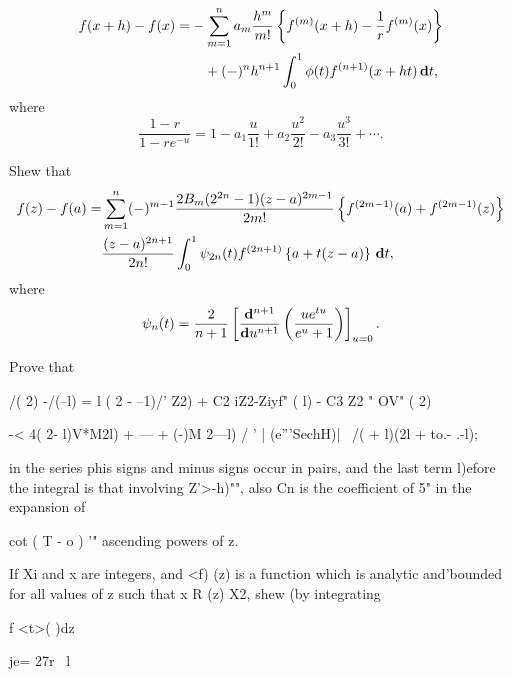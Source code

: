 \begin{wandwmiscexamples}
\begin{wandwmiscexample}
\begin{align*}
      f(x+h) - f(x)
      =&
      -
      \sum_{m=1}^{n}
      a_{m}
      \frac{h^{m}}{m!}
      \left\{ 
        f^{(m)}(x+h) - \frac{1}{r} f^{(m)}(x)
       \right\}
      \\
      & \quad
      +
      (-)^{n} h^{n+1}
      \int_{0}^{1}
      \phi(t) f^{(n+1)}(x+ht) \, \mathbf{d} t,
    \end{align*}
    where
    $$
    \frac{1-r}{1 - r e^{-u}}
    =
    1
    -
    a_{1} \frac{u}{1!}
    +
    a_{2} \frac{u^{2}}{2!}
    -
    a_{3} \frac{u^{3}}{3!}
    +
    \cdots.
    $$
  \end{wandwmiscexample}
  \begin{wandwmiscexample}
    Shew that
    \begin{align*}
      f(z) - f(a)
      =&
      \sum_{m=1}^{n}
      (-)^{m-1}
      \frac{2 B_{m} (2^{2n} - 1)(z-a)^{2m-1}}{2m!}
      \thebrace{
        f^{(2m-1)}(a)
        +
        f^{(2m-1)}(z)
      }
      \\
      &
      \hfill
      \frac{(z-a)^{2n+1}}{2n!}
      \int_{0}^{1}
      \psi_{2n}(t)
      f^{(2n+1)}\thebrace{
        a + t(z-a)
      }
      \dmeasure t,
    \end{align*}
    where
    $$
    \psi_{n}(t)
    =
    \frac{2}{n+1}
    \left[ 
      \frac{\mathbf{d}^{n+1}}{\mathbf{d} u^{n+1}}
      \left( 
        \frac{u e^{tu}}{e^{u} + 1}
       \right)
     \right]_{u=0}.
    $$
  \end{wandwmiscexample}
  \begin{wandwmiscexample}
    Prove that

    /( 2) -/(--l) = l ( 2 - --1)/' Z2) + C2 iZ2-Ziyf" ( l) - C3 Z2 " OV" (
    2)

    -< 4( 2- l)V*M2l) + --- + (-)M 2---l) / ' | (e'''SechH)| \ /( + l)(2l
    + to.- .-l);

    in the series phis signs and minus signs occur in pairs, and the last
    term l)efore the integral is that involving Z'>-h)"", also Cn is the
    coefficient of 5" in the expansion of

    cot ( T - o ) '" ascending powers of z. 
  \end{wandwmiscexample}
  \begin{wandwmiscexample}
    If Xi and x are integers, and <f) (z) is a function which is
    analytic and'bounded for all values of z such that x R (z) X2, shew
    (by integrating

    f <t>( )dz

    je= 27r \ l


\end{wandwmiscexample}
\end{wandwmiscexamples}
